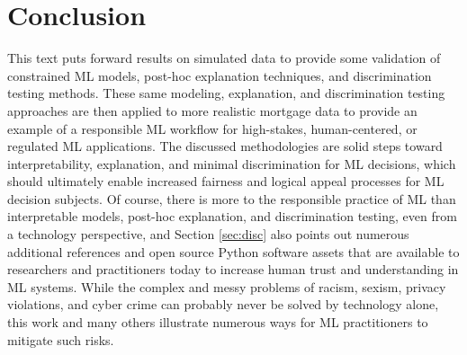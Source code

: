 \documentclass[information,article,submit,moreauthors,pdftex]{definitions/mdpi}
\begin{document}
\section{Conclusion}\label{sec:con}

This text puts forward results on simulated data to provide some validation of constrained ML models, post-hoc explanation techniques, and discrimination testing methods. These same modeling, explanation, and discrimination testing approaches are then applied to more realistic mortgage data to provide an example of a responsible ML workflow for high-stakes, human-centered, or regulated ML applications. The discussed methodologies are solid steps toward interpretability, explanation, and minimal discrimination for ML decisions, which should ultimately enable increased fairness and logical appeal processes for ML decision subjects. Of course, there is more to the responsible practice of ML than interpretable models, post-hoc explanation, and discrimination testing, even from a technology perspective, and Section \ref{sec:disc} also points out numerous additional references and open source Python software assets that are available to researchers and practitioners today to increase human trust and understanding in ML systems. While the complex and messy problems of racism, sexism, privacy violations, and cyber crime can probably never be solved by technology alone, this work and many others illustrate numerous ways for ML practitioners to mitigate such risks. 


\end{document}
